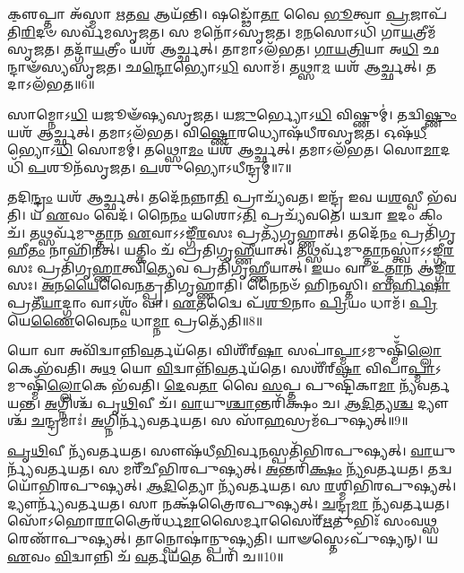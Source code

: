𑌕𑍢॒𑌪𑍍𑌤𑌾 𑌅᳴𑌸𑍍𑌮𑌾 \ul{𑌋}\-𑌤\-\ul{𑌵} 𑌆𑌯᳴𑌨𑍍𑌤𑌿।
𑌷𑌡𑍍𑌢𑍋᳴\-\ul{𑌤𑌾} 𑌵𑍈 \ul{𑌭𑍂}\-𑌤𑍍𑌵𑌾 \ul{𑌪𑍍𑌰}\-𑌜𑌾𑌪᳴𑌤𑌿\-\ul{𑌰𑌿}\-𑌦𑍞 𑌸𑌰𑍍𑌵᳴𑌮\-𑌸𑍃𑌜𑌤।
𑌸 𑌮𑌨𑍋᳴\-𑌽\-𑌸𑍃𑌜𑌤।
𑌮\-\ul{𑌨}\-𑌸𑍋𑌽𑌧𑌿᳴ 𑌗𑌾\-\ul{𑌯}\-𑌤𑍍𑌰𑍀𑌮᳴\-𑌸𑍃𑌜𑌤।
𑌤𑌦𑍍𑌗𑌾᳴\-\ul{𑌯}\-𑌤𑍍𑌰𑍀𑌂 𑌯𑌶᳴ 𑌆𑌰𑍍𑌚𑍍𑌛𑌤𑍍।
𑌤𑌾𑌮𑌾𑌽𑌲᳴𑌭𑌤।
\-\ul{𑌗𑌾}\-\-\ul{𑌯}\-\-\ul{𑌤𑍍𑌰𑌿}\-𑌯𑌾 𑌅\-\ul{𑌧𑌿} 𑌛𑌨𑍍𑌦𑌾𑍟᳴𑌸𑍍𑌯\-𑌸𑍃𑌜𑌤।
𑌛\-\ul{𑌨𑍍𑌦𑍋}\-𑌭𑍍𑌯𑍋𑌽\-\ul{𑌧𑌿} 𑌸𑌾𑌮᳴।
𑌤𑌥𑍍𑌸𑌾\-\ul{𑌮} 𑌯𑌶᳴ 𑌆𑌰𑍍𑌚𑍍𑌛𑌤𑍍।
𑌤𑌦𑌾𑌽𑌲᳴𑌭𑌤॥6॥

𑌸𑌾𑌮𑍍𑌨𑍋𑌽\-\ul{𑌧𑌿} 𑌯𑌜𑍂𑍟᳴𑌷𑍍𑌯\-𑌸𑍃𑌜𑌤।
𑌯\-\ul{𑌜𑍁}\-𑌰𑍍𑌭𑍍𑌯𑍋𑌽\-\ul{𑌧𑌿} 𑌵𑌿𑌷𑍍𑌣𑍁𑌮𑍍॑।
𑌤𑌦𑍍𑌵𑌿\-\ul{𑌷𑍍𑌣𑍁𑌂} 𑌯𑌶᳴ 𑌆𑌰𑍍𑌚𑍍𑌛𑌤𑍍।
𑌤𑌮𑌾𑌽𑌲᳴𑌭𑌤।
𑌵𑌿\-\ul{𑌷𑍍𑌣𑍋}\-𑌰𑌧𑍍𑌯𑍋𑌷᳴𑌧𑍀𑌰\-𑌸𑍃𑌜𑌤।
𑌓𑌷᳴\-\ul{𑌧𑍀}\-𑌭𑍍𑌯𑍋𑌽\-\ul{𑌧𑌿} 𑌸𑍋𑌮𑌮𑍍॑।
𑌤𑌥𑍍𑌸𑍋\-\ul{𑌮𑌂} 𑌯𑌶᳴ 𑌆𑌰𑍍𑌚𑍍𑌛𑌤𑍍।
𑌤𑌮𑌾𑌽𑌲᳴𑌭𑌤।
𑌸𑍋\-\ul{𑌮𑌾}\-𑌦𑌧𑌿᳴ \ul{𑌪}\-𑌶𑍂𑌨᳴\-𑌸𑍃𑌜𑌤।
\-\ul{𑌪}\-𑌶𑍁𑌭𑍍𑌯𑍋\-𑌽𑌧𑍀𑌨𑍍𑌦𑍍𑌰𑌮𑍍॑॥7॥

𑌤𑌦𑌿\-\ul{𑌨𑍍𑌦𑍍𑌰𑌂} 𑌯𑌶᳴ 𑌆𑌰𑍍𑌚𑍍𑌛𑌤𑍍।
𑌤𑌦𑍇᳴\-\ul{𑌨}\-𑌨𑍍𑌨𑌾\-\ul{𑌤𑌿} 𑌪𑍍𑌰𑌾𑌚𑍍𑌯᳴𑌵𑌤।
𑌇𑌨𑍍𑌦𑍍𑌰᳴ 𑌇𑌵 𑌯\-\ul{𑌶}\-𑌸𑍍𑌵𑍀 𑌭᳴𑌵𑌤𑌿।
𑌯 \ul{𑌏}\-𑌵𑌂 𑌵𑍇𑌦᳴।
𑌨𑍈\-\ul{𑌨𑌂} 𑌯𑌶𑍋𑌽\-\ul{𑌤𑌿} 𑌪𑍍𑌰𑌚𑍍𑌯᳴𑌵𑌤𑍇।
𑌯𑌦𑍍𑌵𑌾 \ul{𑌇}\-𑌦𑌂 𑌕𑌿𑌂 𑌚᳴।
𑌤𑌥𑍍𑌸𑌰𑍍𑌵᳴𑌮𑍁\-\ul{𑌤𑍍𑌤𑌾}\-𑌨 \ul{𑌏}\-𑌵𑌾\-𑌽𑌽𑌙𑍍𑌗𑍀᳴\-\ul{𑌰}\-𑌸𑌃 𑌪𑍍𑌰𑌤𑍍𑌯᳴𑌗𑍃𑌹𑍍𑌣𑌾𑌤𑍍।
𑌤𑌦𑍇᳴\-\ul{𑌨𑌂} 𑌪𑍍𑌰𑌤𑌿᳴\-𑌗𑍃𑌹𑍀\-\ul{𑌤𑌂} 𑌨𑌾𑌹𑌿᳴𑌨𑌤𑍍।
𑌯𑌤𑍍𑌕𑌿𑌂 𑌚᳴ 𑌪𑍍𑌰𑌤𑌿𑌗𑍃\-\ul{𑌹𑍍𑌣𑍀}\-𑌯𑌾𑌤𑍍।
𑌤𑌥𑍍𑌸𑌰𑍍𑌵᳴𑌮𑍁\-\ul{𑌤𑍍𑌤𑌾}\-𑌨𑌸𑍍𑌤𑍍𑌵𑌾॑\-𑌽𑌽𑌙𑍍𑌗𑍀\-\ul{𑌰}\-𑌸𑌃 𑌪𑍍𑌰𑌤𑌿᳴\-𑌗𑍃\-\ul{𑌹𑍍𑌣𑌾}\-𑌤𑍍𑌵𑌿\-\ul{𑌤𑍍𑌯𑍇}\-𑌵 𑌪𑍍𑌰𑌤𑌿᳴\-𑌗𑍃𑌹𑍍𑌣𑍀𑌯𑌾𑌤𑍍।
\-\ul{𑌇}\-𑌯𑌂 𑌵𑌾 𑌉᳴\-\ul{𑌤𑍍𑌤𑌾}\-𑌨 𑌆॑𑌙𑍍𑌗𑍀\-\ul{𑌰}\-𑌸𑌃।
\-\ul{𑌅}\-𑌨\-\ul{𑌯𑍈}\-𑌵𑍈\-\ul{𑌨}\-𑌤𑍍𑌪𑍍𑌰𑌤𑌿᳴\-𑌗𑍃𑌹𑍍𑌣𑌾𑌤𑌿।
𑌨𑍈𑌨𑍞᳴ 𑌹𑌿𑌨𑌸𑍍𑌤𑌿।
\-\ul{𑌬}\-\-\ul{𑌰𑍍}\-𑌹𑌿\-\ul{𑌷𑌾} 𑌪𑍍𑌰𑌤𑍀᳴\-\ul{𑌯𑌾}\-𑌦𑍍𑌗𑌾𑌂 𑌵𑌾𑌽𑌶𑍍𑌵𑌂᳴ 𑌵𑌾।
\-\ul{𑌏}\-𑌤𑌦𑍍𑌵𑍈 𑌪᳴\-\ul{𑌶𑍂}\-𑌨𑌾𑌂 \ul{𑌪𑍍𑌰𑌿}\-𑌯𑌂 𑌧𑌾𑌮᳴।
\-\ul{𑌪𑍍𑌰𑌿}\-𑌯𑍇\-\ul{𑌣𑍈}\-𑌵𑍈\-\ul{𑌨𑌂} 𑌧𑌾\-\ul{𑌮𑍍𑌨𑌾} 𑌪𑍍𑌰𑌤𑍍𑌯𑍇᳴𑌤𑌿॥8॥\anuvakamend[\-\ul{𑌵𑌿}\-𑌗𑍍𑌰𑌾𑌹᳴\-\ul{𑌮𑍃}\-𑌤\-\ul{𑌵}\-𑌸𑍍𑌤𑌦𑌾\-𑌽𑌲᳴\-\ul{𑌭}\-𑌤𑍇𑌨𑍍𑌦𑍍𑌰𑌂᳴ 𑌗𑍃𑌹𑍍𑌣𑍀\-\ul{𑌯𑌾}\-𑌥𑍍𑌷𑌟𑍍𑌚᳴]

𑌯𑍋 𑌵𑌾 𑌅𑌵𑌿᳴𑌦𑍍𑌵𑌾𑌨𑍍𑌨𑌿\-\ul{𑌵}\-𑌰𑍍𑌤𑌯᳴𑌤𑍇।
𑌵𑌿𑌶𑍀᳴𑌰𑍍‌\mbox{}\-\ul{𑌷𑌾} 𑌸𑌪𑌾॑\-\ul{𑌪𑍍𑌮𑌾}\-\-𑌽𑌮𑍁𑌷𑍍𑌮𑌿𑌁᳴\-\ul{𑌲𑍍𑌲𑍋}\-𑌕𑍇 𑌭᳴𑌵𑌤𑌿।
𑌅\-\ul{𑌥} 𑌯𑍋 \ul{𑌵𑌿}\-𑌦𑍍𑌵𑌾𑌨𑍍𑌨𑌿᳴\-\ul{𑌵}\-𑌰𑍍𑌤𑌯᳴𑌤𑍇।
𑌸𑌶𑍀᳴𑌰𑍍‌\mbox{}\-\ul{𑌷𑌾} 𑌵𑌿𑌪𑌾॑\-\ul{𑌪𑍍𑌮𑌾}\-\-𑌽𑌮𑍁𑌷𑍍𑌮𑌿𑌁᳴\-\ul{𑌲𑍍𑌲𑍋}\-𑌕𑍇 𑌭᳴𑌵𑌤𑌿।
\-\ul{𑌦𑍇}\-𑌵\-\ul{𑌤𑌾} 𑌵𑍈 \ul{𑌸}\-𑌪𑍍𑌤 𑌪𑍁𑌷𑍍𑌟𑌿᳴𑌕𑌾\-\ul{𑌮𑌾} 𑌨𑍍𑌯᳴𑌵𑌰𑍍𑌤𑌯𑌨𑍍𑌤।
\-\ul{𑌅}\-𑌗𑍍𑌨𑌿𑌶𑍍𑌚᳴ 𑌪𑍃\-\ul{𑌥𑌿}\-𑌵𑍀 𑌚᳴।
\-\ul{𑌵𑌾}\-𑌯𑍁\-\ul{𑌶𑍍𑌚𑌾}\-𑌨𑍍𑌤𑌰𑌿᳴𑌕𑍍𑌷𑌂 𑌚।
\-\ul{𑌆}\-\-\ul{𑌦𑌿}\-𑌤𑍍𑌯\-\ul{𑌶𑍍𑌚} 𑌦𑍍𑌯𑍗𑌶𑍍𑌚᳴ \ul{𑌚}\-𑌨𑍍𑌦𑍍𑌰𑌮𑌾𑌃॑।
\-\ul{𑌅}\-𑌗𑍍𑌨𑌿𑌰𑍍𑌨𑍍𑌯᳴𑌵𑌰𑍍𑌤𑌯𑌤।
𑌸 𑌸𑌾᳴\-\ul{𑌹}\-𑌸𑍍𑌰𑌮᳴𑌪𑍁𑌷𑍍𑌯𑌤𑍍॥9॥

\-\ul{𑌪𑍃}\-\-\ul{𑌥𑌿}\-𑌵𑍀 𑌨𑍍𑌯᳴𑌵𑌰𑍍𑌤𑌯𑌤।
𑌸𑍗𑌷᳴𑌧𑍀\-\ul{𑌭𑌿}\-𑌰𑍍𑌵\-\ul{𑌨}\-𑌸𑍍𑌪𑌤𑌿᳴𑌭𑌿𑌰𑌪𑍁𑌷𑍍𑌯𑌤𑍍।
\-\ul{𑌵𑌾}\-𑌯𑍁𑌰𑍍𑌨𑍍𑌯᳴\-𑌵𑌰𑍍𑌤𑌯𑌤।
𑌸 𑌮𑌰𑍀᳴𑌚𑍀𑌭𑌿𑌰𑌪𑍁𑌷𑍍𑌯𑌤𑍍।
\-\ul{𑌅}\-𑌨𑍍𑌤𑌰𑌿᳴\-\ul{𑌕𑍍𑌷𑌂} 𑌨𑍍𑌯᳴𑌵𑌰𑍍𑌤𑌯𑌤।
𑌤𑌦𑍍𑌵𑌯𑍋᳴𑌭𑌿𑌰\-𑌪𑍁𑌷𑍍𑌯𑌤𑍍।
\-\ul{𑌆}\-\-\ul{𑌦𑌿}\-𑌤𑍍𑌯𑍋 𑌨𑍍𑌯᳴𑌵𑌰𑍍𑌤𑌯𑌤।
𑌸 \ul{𑌰}\-𑌶𑍍𑌮𑌿𑌭𑌿᳴𑌰𑌪𑍁𑌷𑍍𑌯𑌤𑍍।
𑌦𑍍𑌯𑍗𑌰𑍍𑌨𑍍𑌯᳴\-𑌵𑌰𑍍𑌤𑌯𑌤।
𑌸𑌾 𑌨𑌕𑍍𑌷᳴𑌤𑍍𑌰𑍈𑌰𑌪𑍁𑌷𑍍𑌯𑌤𑍍।
\-\ul{𑌚}\-𑌨𑍍𑌦𑍍𑌰\-\ul{𑌮𑌾} 𑌨𑍍𑌯᳴𑌵𑌰𑍍𑌤𑌯𑌤।
𑌸𑍋᳴𑌽𑌹𑍋\-\ul{𑌰𑌾}\-𑌤𑍍𑌰𑍈𑌰᳴𑌰𑍍𑌧\-\-\ul{𑌮𑌾}\-𑌸𑍈𑌰𑍍𑌮𑌾𑌸𑍈𑌰𑍍᳴\-\ul{𑌋}\-𑌤𑍁𑌭𑌿𑌃᳴ 𑌸𑌂𑌵\-\ul{𑌥𑍍𑌸}\-𑌰𑍇𑌣𑌾᳴𑌪𑍁𑌷𑍍𑌯𑌤𑍍।
𑌤𑌾𑌨𑍍𑌪𑍋𑌷𑌾॑𑌨𑍍𑌪𑍁𑌷𑍍𑌯𑌤𑌿।
𑌯𑌾𑍟𑌸𑍍𑌤𑍇\-𑌽𑌪𑍁᳴𑌷𑍍𑌯𑌨𑍍।
𑌯 \ul{𑌏}\-𑌵𑌂 \ul{𑌵𑌿}\-𑌦𑍍𑌵𑌾𑌨𑍍𑌨𑌿 𑌚᳴ \ul{𑌵}\-𑌰𑍍𑌤𑌯᳴\-\ul{𑌤𑍇} 𑌪𑌰𑌿᳴ 𑌚॥10॥\anuvakamend[\-\ul{𑌅}\-\-\ul{𑌪𑍁}\-\-\ul{𑌷𑍍𑌯}\-𑌨𑍍𑌨𑌕𑍍𑌷᳴𑌤𑍍𑌰𑍈𑌰𑌪𑍁\-\ul{𑌷𑍍𑌯}\-𑌤𑍍𑌪𑌞𑍍𑌚᳴ 𑌚]

